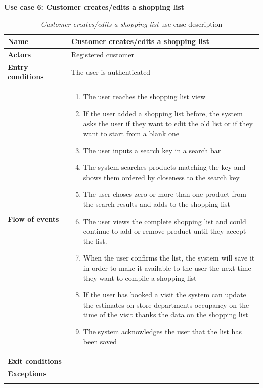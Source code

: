\clearpage
\textbf{Use case 6: Customer creates/edits a shopping list}
\smallskip
{}
\begin{longtable}{p{0.25\linewidth}p{0.75\linewidth}}
    \toprule
    \textbf{Name}             & \textbf{Customer creates/edits a shopping list} \\
    \midrule
    \textbf{Actors}           & Registered customer                             \\
    \midrule
    \textbf{Entry conditions} & The user is authenticated                       \\
    \midrule
    \textbf{Flow of events}   &
    \begin{enumerate}
        \item The user reaches the shopping list view
        \item If the user added a shopping list before, the system asks the user if they want to edit the old list or if they want to start from a blank one
        \item The user inputs a search key in a search bar
        \item The system searches products matching the key and shows them ordered by closeness to the search key
        \item The user choses zero or more than one product from the search results and adds to the shopping list
        \item The user views the complete shopping list and could continue to add or remove product until they accept the list.
        \item When the user confirms the list, the system will save it in order to make it available to the user the next time they want to compile a shopping list
        \item If the user has booked a visit the system can update the estimates on store departments occupancy on the time of the visit thanks the data on the shopping list
        \item The system acknowledges the user that the list has been saved
    \end{enumerate}                                                  \\
    \midrule
    \textbf{Exit conditions}  &                                                 \\
    \midrule
    \textbf{Exceptions}       &                                                 \\
    \bottomrule
    \caption{\emph{Customer creates/edits a shopping list} use case description}
\end{longtable}

